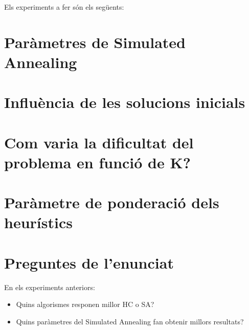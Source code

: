 
Els experiments a fer són els següents:

\section{Paràmetres de Simulated Annealing} %
\label{sec:expSA}


\section{Influència de les solucions inicials} %
\label{sec:expsolini}

	

\section{Com varia la dificultat del problema en funció de K?} %
\label{sec:expk}



\newpage %
\section{Paràmetre de ponderació dels heurístics} %
\label{sec:expkh}



\section{Preguntes de l'enunciat} %
\label{sec:preguntes}

En els experiments anteriors:
\begin{itemize}
\item Quins algorismes responen millor HC o SA?
\item Quins paràmetres del Simulated Annealing fan obtenir millors resultats?
\end{itemize}

